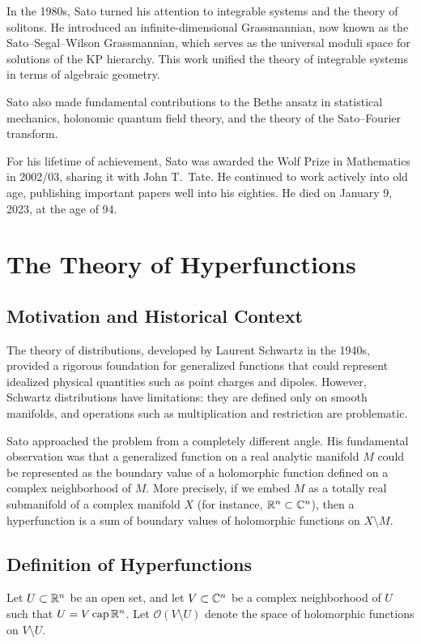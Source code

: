 In the 1980s, Sato turned his attention to integrable systems and the theory of solitons. He introduced an infinite-dimensional Grassmannian, now known as the Sato--Segal--Wilson Grassmannian, which serves as the universal moduli space for solutions of the KP hierarchy. This work unified the theory of integrable systems in terms of algebraic geometry.

Sato also made fundamental contributions to the Bethe ansatz in statistical mechanics, holonomic quantum field theory, and the theory of the Sato--Fourier transform.

For his lifetime of achievement, Sato was awarded the Wolf Prize in Mathematics in 2002/03, sharing it with John T.\ Tate. He continued to work actively into old age, publishing important papers well into his eighties. He died on January 9, 2023, at the age of 94.

\section{The Theory of Hyperfunctions}

\subsection{Motivation and Historical Context}

The theory of distributions, developed by Laurent Schwartz in the 1940s, provided a rigorous foundation for generalized functions that could represent idealized physical quantities such as point charges and dipoles. However, Schwartz distributions have limitations: they are defined only on smooth manifolds, and operations such as multiplication and restriction are problematic.

Sato approached the problem from a completely different angle. His fundamental observation was that a generalized function on a real analytic manifold \(M\) could be represented as the boundary value of a holomorphic function defined on a complex neighborhood of \(M\). More precisely, if we embed \(M\) as a totally real submanifold of a complex manifold \(X\) (for instance, \(\mathbb{R}^n \subset \mathbb{C}^n\)), then a hyperfunction is a sum of boundary values of holomorphic functions on \(X \setminus M\).

\subsection{Definition of Hyperfunctions}

Let \(U \subset \mathbb{R}^n\) be an open set, and let \(V \subset \mathbb{C}^n\) be a complex neighborhood of \(U\) such that \(U = V \operatorname{\mathrm{cap}} \mathbb{R}^n\). Let \(\mathcal{O}(V \setminus U)\) denote the space of holomorphic functions on \(V \setminus U\).

